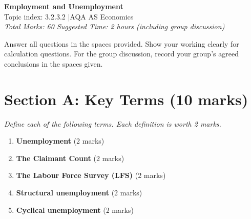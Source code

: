 \documentclass[12pt,a4paper]{article}
\begin{document}
\begin{center}
    \Large\textbf{Employment and Unemployment}\\[5pt]
    \normalsize Topic index: 3.2.3.2 \quad|\quad AQA AS Economics\\[3pt]
    \textit{Total Marks: 60 \quad Suggested Time: 2 hours (including group discussion)}
\end{center}

\vspace{0.8em}

\begin{instructions}
    Answer all questions in the spaces provided. Show your working clearly for calculation questions. For the group discussion, record your group's agreed conclusions in the spaces given.
\end{instructions}

\vspace{1em}

\section*{Section A: Key Terms (10 marks)}

\textit{Define each of the following terms. Each definition is worth 2 marks.}

\vspace{0.5em}

\begin{enumerate}[leftmargin=*, label=\textbf{\arabic*.}]

    \item \textbf{Unemployment} \hfill (2 marks)\\[3cm]

    \item \textbf{The Claimant Count} \hfill (2 marks)\\[3cm]

    \item \textbf{The Labour Force Survey (LFS)} \hfill (2 marks)\\[3cm]

    \item \textbf{Structural unemployment} \hfill (2 marks)\\[3cm]

    \item \textbf{Cyclical unemployment} \hfill (2 marks)\\[3cm]

\end{enumerate}
\end{document}
